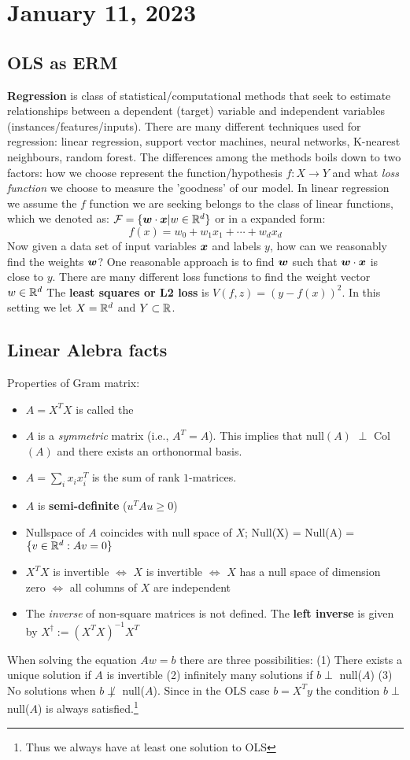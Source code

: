 \section{January 11, 2023}
\subsection{OLS as ERM}
\textbf{Regression} is class of statistical/computational methods that seek to estimate relationships between a dependent (target) variable and independent variables (instances/features/inputs).
There are many different techniques used for regression: linear regression, support vector machines, neural networks, K-nearest neighbours, random forest.
The differences among the methods boils down to two factors: how we choose represent the function/hypothesis $f: X \to Y$ and what \textit{loss function} we choose to measure the 'goodness' of our model. 
In linear regression we assume the $f$ function we are seeking belongs to the class of linear functions, which we denoted as:  $\mathcal F = \{\boldsymbol{w} \cdot \boldsymbol{x} | w \in \mathbb R^d \}$ or in a expanded form:
$$
f(x) = w_0 + w_1 x_1 + \cdots + w_d x_d
$$
Now given a data set of input variables $\boldsymbol{x}$ and labels $y$, how can we reasonably find the weights $\boldsymbol{w}$? One reasonable approach is to find $\boldsymbol{w}$ such that $\boldsymbol{w} \cdot \boldsymbol{x}$ is close to $y$.
There are many different loss functions to find the weight vector $w \in \mathbb R^d$
The \textbf{least squares or L2 loss} is $V(f,z) = (y - f(x))^2$. In this setting  we let $X = \mathbb R^d$ and $Y \subset \mathbb R$. 
\subsection{Linear Alebra facts}
Properties of Gram matrix:
\begin{itemize}
    \item $A = X^T X$ is called the 
    \item $A$ is a \textit{symmetric} matrix (i.e., $A^T = A$). This implies that null$(A)$ $\perp$ Col$(A)$ and there exists an orthonormal basis.
    \item $A = \sum_{i}x_ix_{i}^T$ is the sum of rank $1$-matrices.
    \item $A$ is \textbf{semi-definite} ($u^TAu \geq 0$)
    \item Nullspace of $A$ coincides with null space of $X$; Null(X) = Null(A) = $\{v \in \mathbb R^d : Av =0\}$
    \item $X^T X$ is invertible $\iff$ $X$ is invertible $\iff$ $X$ has a null space of dimension zero $\iff$ all columns of $X$ are independent
    \item The \textit{inverse} of non-square matrices is not defined. The \textbf{left inverse} is given by $X^{\dag} := (X^TX)^{-1}X^T $
\end{itemize}
When solving the equation $Aw =b$ there are three possibilities: (1) There exists a unique solution if $A$ is invertible (2) infinitely many solutions if $b \perp$ null($A$) (3) No solutions when $b \not\perp$ null($A$). Since in the OLS case $b = X^Ty$ the condition $b \perp$ null($A$) is always satisfied.\footnote{Thus we always have at least one solution to OLS}
